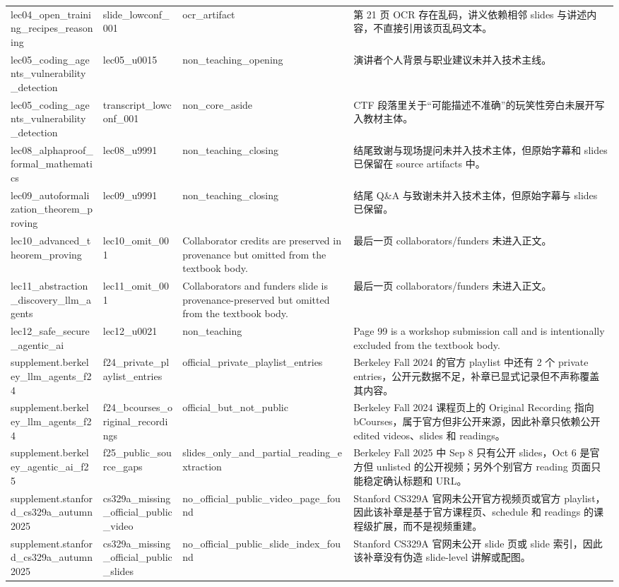 \begin{longtable}{p{}p{}p{}p{}}
lec04\_open\_training\_recipes\_reasoning & slide\_lowconf\_001 & ocr\_artifact & 第 21 页 OCR 存在乱码，讲义依赖相邻 slides 与讲述内容，不直接引用该页乱码文本。 \\
lec05\_coding\_agents\_vulnerability\_detection & lec05\_u0015 & non\_teaching\_opening & 演讲者个人背景与职业建议未并入技术主线。 \\
lec05\_coding\_agents\_vulnerability\_detection & transcript\_lowconf\_001 & non\_core\_aside & CTF 段落里关于“可能描述不准确”的玩笑性旁白未展开写入教材主体。 \\
lec08\_alphaproof\_formal\_mathematics & lec08\_u9991 & non\_teaching\_closing & 结尾致谢与现场提问未并入技术主体，但原始字幕和 slides 已保留在 source artifacts 中。 \\
lec09\_autoformalization\_theorem\_proving & lec09\_u9991 & non\_teaching\_closing & 结尾 Q\&A 与致谢未并入技术主体，但原始字幕与 slides 已保留。 \\
lec10\_advanced\_theorem\_proving & lec10\_omit\_001 & Collaborator credits are preserved in provenance but omitted from the textbook body. & 最后一页 collaborators/funders 未进入正文。 \\
lec11\_abstraction\_discovery\_llm\_agents & lec11\_omit\_001 & Collaborators and funders slide is provenance-preserved but omitted from the textbook body. & 最后一页 collaborators/funders 未进入正文。 \\
lec12\_safe\_secure\_agentic\_ai & lec12\_u0021 & non\_teaching & Page 99 is a workshop submission call and is intentionally excluded from the textbook body. \\
supplement.berkeley\_llm\_agents\_f24 & f24\_private\_playlist\_entries & official\_private\_playlist\_entries & Berkeley Fall 2024 的官方 playlist 中还有 2 个 private entries，公开元数据不足，补章已显式记录但不声称覆盖其内容。 \\
supplement.berkeley\_llm\_agents\_f24 & f24\_bcourses\_original\_recordings & official\_but\_not\_public & Berkeley Fall 2024 课程页上的 Original Recording 指向 bCourses，属于官方但非公开来源，因此补章只依赖公开 edited videos、slides 和 readings。 \\
supplement.berkeley\_agentic\_ai\_f25 & f25\_public\_source\_gaps & slides\_only\_and\_partial\_reading\_extraction & Berkeley Fall 2025 中 Sep 8 只有公开 slides，Oct 6 是官方但 unlisted 的公开视频；另外个别官方 reading 页面只能稳定确认标题和 URL。 \\
supplement.stanford\_cs329a\_autumn2025 & cs329a\_missing\_official\_public\_video & no\_official\_public\_video\_page\_found & Stanford CS329A 官网未公开官方视频页或官方 playlist，因此该补章是基于官方课程页、schedule 和 readings 的课程级扩展，而不是视频重建。 \\
supplement.stanford\_cs329a\_autumn2025 & cs329a\_missing\_official\_public\_slides & no\_official\_public\_slide\_index\_found & Stanford CS329A 官网未公开 slide 页或 slide 索引，因此该补章没有伪造 slide-level 讲解或配图。 \\
\bottomrule
\end{longtable}
\normalsize
